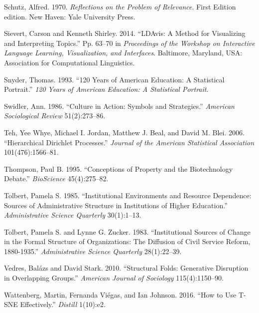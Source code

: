 \documentclass[]{book}
\theoremstyle{definition}
\theoremstyle{definition}
\theoremstyle{definition}
\theoremstyle{remark}
\begin{document}
\leavevmode\hypertarget{ref-Schutz1970Reflections}{}%
Schutz, Alfred. 1970. \emph{Reflections on the Problem of Relevance}.
First Edition edition. New Haven: Yale University Press.

\leavevmode\hypertarget{ref-Sievert2014LDAvis}{}%
Sievert, Carson and Kenneth Shirley. 2014. ``LDAvis: A Method for
Visualizing and Interpreting Topics.'' Pp. 63--70 in \emph{Proceedings
of the Workshop on Interactive Language Learning, Visualization, and
Interfaces}. Baltimore, Maryland, USA: Association for Computational
Linguistics.

\leavevmode\hypertarget{ref-Snyder1993120}{}%
Snyder, Thomas. 1993. ``120 Years of American Education: A Statistical
Portrait.'' \emph{120 Years of American Education: A Statistical
Portrait}.

\leavevmode\hypertarget{ref-Swidler1986Culture}{}%
Swidler, Ann. 1986. ``Culture in Action: Symbols and Strategies.''
\emph{American Sociological Review} 51(2):273--86.

\leavevmode\hypertarget{ref-Teh2006Hierarchical}{}%
Teh, Yee Whye, Michael I. Jordan, Matthew J. Beal, and David M. Blei.
2006. ``Hierarchical Dirichlet Processes.'' \emph{Journal of the
American Statistical Association} 101(476):1566--81.

\leavevmode\hypertarget{ref-Thompson1995Conceptions}{}%
Thompson, Paul B. 1995. ``Conceptions of Property and the Biotechnology
Debate.'' \emph{BioScience} 45(4):275--82.

\leavevmode\hypertarget{ref-Tolbert1985Institutional}{}%
Tolbert, Pamela S. 1985. ``Institutional Environments and Resource
Dependence: Sources of Administrative Structure in Institutions of
Higher Education.'' \emph{Administrative Science Quarterly} 30(1):1--13.

\leavevmode\hypertarget{ref-Tolbert1983Institutional}{}%
Tolbert, Pamela S. and Lynne G. Zucker. 1983. ``Institutional Sources of
Change in the Formal Structure of Organizations: The Diffusion of Civil
Service Reform, 1880-1935.'' \emph{Administrative Science Quarterly}
28(1):22--39.

\leavevmode\hypertarget{ref-Vedres2010Structural}{}%
Vedres, Balázs and David Stark. 2010. ``Structural Folds: Generative
Disruption in Overlapping Groups.'' \emph{American Journal of Sociology}
115(4):1150--90.

\leavevmode\hypertarget{ref-Wattenberg2016How}{}%
Wattenberg, Martin, Fernanda Viégas, and Ian Johnson. 2016. ``How to Use
T-SNE Effectively.'' \emph{Distill} 1(10):e2.
\end{document}
